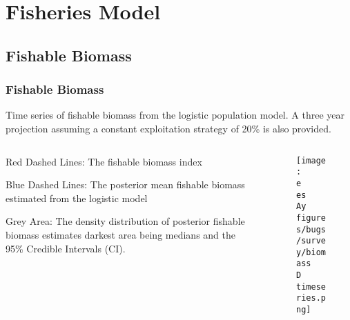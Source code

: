 \section{Fisheries Model}
\subsection{Fishable Biomass}

\begin{frame}
\frametitle{Fishable Biomass}
Time series of fishable biomass from the logistic population model. A three year projection assuming a constant exploitation strategy of 20\% is also provided.
\begin{columns}
\begin{column}{0.5\textwidth}
\begin{itemize}
\begin{footnotesize}
	\item Red Dashed Lines: The fishable biomass index
	\item Blue Dashed Lines: The posterior mean fishable biomass estimated from the logistic model
	\item Grey Area: The density distribution of posterior fishable biomass estimates darkest area being medians and the 95\% Credible Intervals (CI). 
\end{footnotesize}
\end{itemize}
\end{column}

\begin{column}{0.5\textwidth}
\begin{figure}[ht]
    \centering
    \texttt{[image: \\e \\es \\Ay figures/bugs/survey/biomass\\D timeseries.png]}
\end{figure}
\end{column}

\end{columns}
\end{frame}

